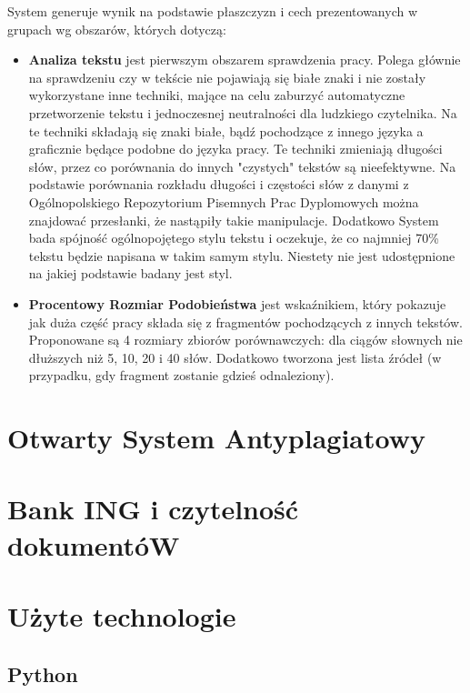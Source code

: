 \documentclass[a4paper,12pt,twoside,openany]{report}
\begin{document}
System generuje wynik na podstawie płaszczyzn i cech prezentowanych w grupach wg obszarów, których dotyczą: 
\begin{itemize}
	\item \textbf{Analiza tekstu} jest pierwszym obszarem sprawdzenia pracy. Polega głównie na sprawdzeniu czy w tekście nie pojawiają się białe znaki i nie zostały wykorzystane inne techniki, mające na celu zaburzyć automatyczne przetworzenie tekstu i jednoczesnej neutralności dla ludzkiego czytelnika. \linebreak 
	Na te techniki składają się znaki białe, bądź pochodzące z innego języka a graficznie będące podobne do języka pracy. Te techniki zmieniają długości słów, przez co porównania do innych "czystych" tekstów są nieefektywne. Na podstawie porównania rozkładu długości i częstości słów z danymi z Ogólnopolskiego Repozytorium Pisemnych Prac Dyplomowych można znajdować przesłanki, że nastąpiły takie manipulacje. \linebreak
	Dodatkowo System bada spójność ogólnopojętego stylu tekstu i oczekuje, że co najmniej 70\% tekstu będzie napisana w takim samym stylu. Niestety nie jest udostępnione na jakiej podstawie badany jest styl.
	  
	\item \textbf{Procentowy Rozmiar Podobieństwa} jest wskaźnikiem, który pokazuje jak duża część pracy składa się z fragmentów pochodzących z innych tekstów. Proponowane są 4 rozmiary zbiorów porównawczych: dla ciągów słownych nie dłuższych niż 5, 10, 20 i 40 słów. Dodatkowo tworzona jest lista źródeł (w przypadku, gdy fragment zostanie gdzieś odnaleziony).
	
\end{itemize}


\section{Otwarty System Antyplagiatowy}


\section{Bank ING i czytelność dokumentóW}
\section{Użyte technologie}
\subsection{Python}
\end{document}
